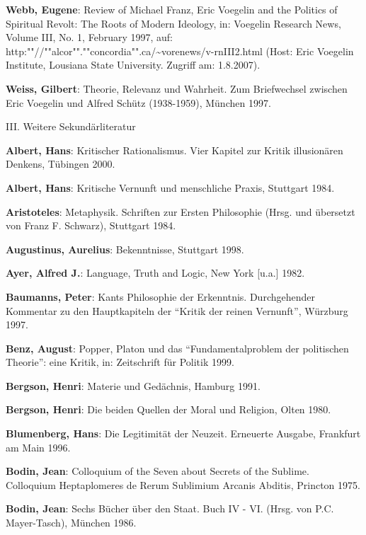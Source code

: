 {\bf Webb, Eugene}: Review of Michael Franz, Eric Voegelin and the
Po\-li\-tics of Spiritual Revolt: The Roots of Modern Ideology, in:
Voe\-ge\-lin Research News, Volume III, No. 1, February 1997, auf:
http:""//""alcor"".""concordia"".ca/\~{ }vorenews/v-rnIII2.html (Host: Eric
Voegelin Institute, Lousiana State University. Zugriff am: 1.8.2007).

{\bf Weiss, Gilbert}: Theorie, Relevanz und Wahrheit. Zum Briefwechsel
zwischen Eric Voegelin und Alfred Schütz (1938-1959), München 1997.



\setlength{\parskip}{5ex}

{\large III. Weitere Sekundärliteratur}

\setlength{\parskip}{3ex}

{\bf Albert, Hans}: Kritischer Rationalismus. Vier Kapitel zur Kritik
illusionären Denkens, Tübingen 2000.

\setlength{\parskip}{1.5ex}

{\bf Albert, Hans}: Kritische Vernunft und menschliche Praxis, Stuttgart 1984.

{\bf Aristoteles}: Metaphysik. Schriften zur Ersten Philosophie (Hrsg. und
übersetzt von Franz F. Schwarz), Stuttgart 1984.

{\bf Augustinus, Aurelius}: Bekenntnisse, Stuttgart 1998.

{\bf Ayer, Alfred J.}: Language, Truth and Logic, New York [u.a.] 1982.

{\bf Baumanns, Peter}: Kants Philosophie der Erkenntnis. Durchgehender
Kommentar zu den Hauptkapiteln der "`Kritik der reinen Vernunft"', Würzburg
1997.

{\bf Benz, August}: Popper, Platon und das "`Fundamentalproblem der
politischen Theorie"': eine Kritik, in: Zeitschrift für Politik 1999.

{\bf Bergson, Henri}: Materie und Gedächnis, Hamburg 1991.

{\bf Bergson, Henri}: Die beiden Quellen der Moral und Religion, Olten 1980.

{\bf Blumenberg, Hans}: Die Legitimität der Neuzeit. Erneuerte Ausgabe,
Frankfurt am Main 1996.

{\bf Bodin, Jean}: Colloquium of the Seven about Secrets of the
Sublime. Colloquium Heptaplomeres de Rerum Sublimium Arcanis Abditis, Princton
1975.

{\bf Bodin, Jean}: Sechs Bücher über den Staat. Buch IV - VI. (Hrsg. von
P.C. Mayer-Tasch), München 1986.

